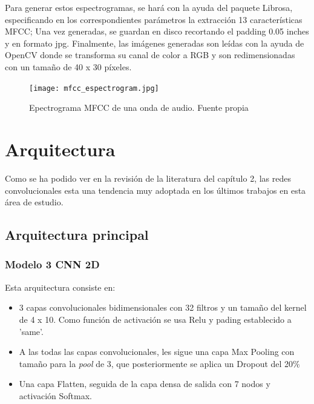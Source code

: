 \documentclass[11pt,a4paper,spanish]{book}
\begin{document}
	Para generar estos espectrogramas, se hará con la ayuda del paquete Librosa, especificando en los correspondientes parámetros la extracción 13 características MFCC; Una vez generadas, se guardan en disco recortando el padding 0.05 inches y en formato jpg.
	Finalmente, las imágenes generadas son leídas con la ayuda de OpenCV donde se transforma su canal de color a RGB y son redimensionadas con un tamaño de 40 x 30 píxeles.
	
	\begin{figure}[H]
		\centering
		\texttt{[image: mfcc\_espectrogram.jpg]} 
		\caption{Epectrograma MFCC de una onda de audio. Fuente propia}
		\label{fig:mfcc_sample}
	\end{figure}
	
	
	\section{Arquitectura}
	\label{sec:arquitectura_cap4}
	Como se ha podido ver en la revisión de la literatura del capítulo 2, las redes convolucionales esta una tendencia muy adoptada en los últimos trabajos en esta área de estudio.
	
	
	\subsection{Arquitectura principal}
		\subsubsection{Modelo 3 CNN 2D}
		Esta arquitectura consiste en:
		\begin{itemize}
			\item 3 capas convolucionales bidimensionales con 32 filtros y un tamaño del kernel de 4 x 10. Como función de activación se usa Relu y pading establecido a 'same'.
			
			\item A las todas las capas convolucionales, les sigue una capa Max Pooling con tamaño para la \emph{pool} de 3, que posteriormente se aplica un Dropout del 20\%
			
			\item Una capa Flatten, seguida de la capa densa de salida con 7 nodos y activación Softmax.
		\end{itemize}
		
\end{document}
